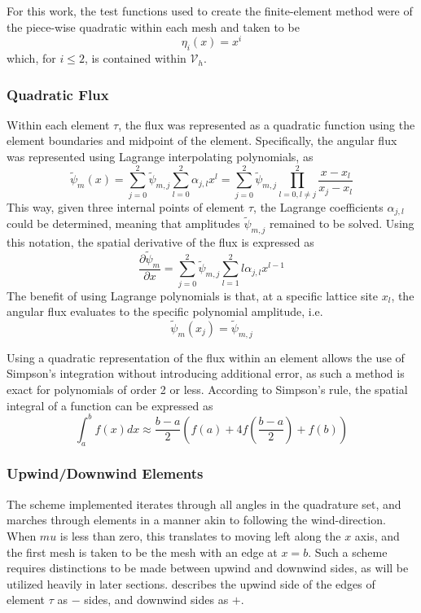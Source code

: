 \documentclass{article}
\newcommand{\mfesv}{\mathcal{V}_h}
\newcommand{\pdiff}[2]{\frac{\partial#1}{\partial#2}}
\newcommand{\tfem}{finite-element method }
\newcommand{\fepsim}{\tilde{\psi}_m}
\newcommand{\fepsimj}{\tilde{\psi}_{m,j}}
\newcommand{\ajl}{\alpha_{j,l}}
\begin{document}
For this work, the test functions used to create the \tfem were of the piece-wise quadratic within each
mesh and taken to be
\begin{equation}
    \label{eq:testfuncs}
    \eta_i(x) = x^i
\end{equation}
which, for $i\leq2$, is contained within $\mfesv$.


\subsubsection{Quadratic Flux}
Within each element $\tau$, the flux was represented as a quadratic function using the element boundaries and 
midpoint of the element.
Specifically, the angular flux was represented using Lagrange interpolating polynomials, as
\begin{equation}
    \label{eq:fluxPoly}
    \fepsim(x) = \sum_{j=0}^2\fepsimj\sum_{l=0}^2\ajl x^l
    = \sum_{j=0}^2\fepsimj\prod_{l=0,l\neq j}^2\frac{x-x_l}{x_j-x_l}
\end{equation}
This way, given three internal points of element $\tau$, the Lagrange coefficients
$\ajl$ could be determined, meaning that amplitudes $\fepsimj$ remained to
be solved.
Using this notation, the spatial derivative of the flux is expressed as
\begin{equation}
    \label{eq:fluxDeriv}
    \pdiff{\fepsim}{x} = \sum_{j=0}^2\fepsimj\sum_{l=1}^2l\ajl x^{l-1}
\end{equation}
The benefit of using Lagrange polynomials is that, at a specific lattice site $x_l$, the 
angular flux evaluates to the specific polynomial amplitude, i.e.
\begin{equation}
    \tilde{\psi}_m(x_j) =\fepsimj 
\end{equation}

Using a quadratic representation of the flux within an element allows the use of Simpson's
integration without introducing additional error, as such a method is exact for polynomials
of order 2 or less.
According to Simpson's rule, the spatial integral of a function can be expressed as
\begin{equation}
    \label{eq:simpsInt}
    \int_a^bf(x)dx \approx \frac{b-a}{2}\left(f(a) + 4f\left(\frac{b-a}{2}\right) + f(b)\right)
\end{equation}

\subsubsection{Upwind/Downwind Elements}
The scheme implemented iterates through all angles in the quadrature set, and marches through
elements in a manner akin to following the wind-direction. When $mu$ is less than zero, this 
translates to moving left along the $x$ axis, and the first mesh is taken to be the mesh
with an edge at $x=b$. 
Such a scheme requires distinctions to be made between upwind and downwind sides, as will be utilized
heavily in later sections.  describes the upwind side of the edges of element $\tau$
as $-$ sides, and downwind sides as $+$.
\end{document}

